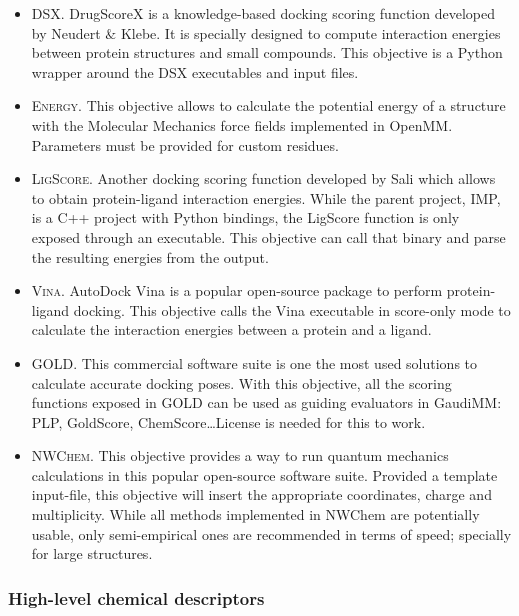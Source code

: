 \begin{itemize}
	\item \textsc{DSX}. DrugScoreX is a knowledge-based docking scoring function developed by Neudert $\&$  Klebe.\cite{neudert2011dsx} It is specially designed to compute interaction energies between protein structures and small compounds. This objective is a Python wrapper around the DSX executables and input files.

	\item \textsc{Energy}. This objective allows to calculate the potential energy of a structure with the Molecular Mechanics force fields implemented in OpenMM. Parameters must be provided for custom residues.

	\item \textsc{LigScore}. Another docking scoring function developed by Sali\cite{krammer2005ligscore} which allows to obtain protein-ligand interaction energies. While the parent project, IMP,\cite{russel2012putting} is a C++ project with Python bindings, the LigScore function is only exposed through an executable. This objective can call that binary and parse the resulting energies from the output.

	\item \textsc{Vina}. AutoDock Vina\cite{trott2010autodock} is a popular open-source package to perform protein-ligand docking. This objective calls the Vina executable in score-only mode to calculate the interaction energies between a protein and a ligand.

	\item \textsc{GOLD}. This commercial software suite is one the most used solutions to calculate accurate docking poses. With this objective, all the scoring functions exposed in GOLD\cite{gold} can be used as guiding evaluators in GaudiMM: PLP, GoldScore, ChemScore\ldots  License is needed for this to work.

	\item \textsc{NWChem}. This objective provides a way to run quantum mechanics calculations in this popular open-source software suite.\cite{nwchem} Provided a template input-file, this objective will insert the appropriate coordinates, charge and multiplicity. While all methods implemented in NWChem are potentially usable, only semi-empirical ones are recommended in terms of speed; specially for large structures.


\end{itemize}\subsubsection{High-level chemical descriptors}
